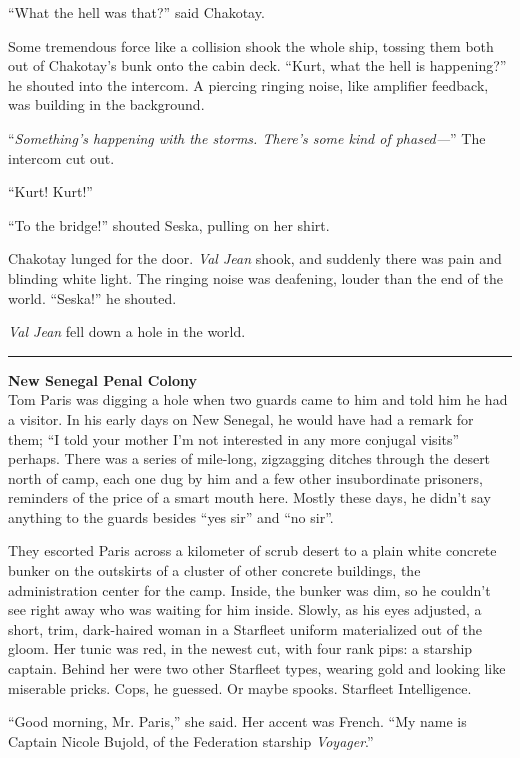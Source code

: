 \documentclass[twoside,letterpaper,12pt]{memoir}
\begin{document}
``What the hell was that?'' said Chakotay.

Some tremendous force like a collision shook the whole ship, tossing them both out of Chakotay's bunk onto the cabin deck. ``Kurt, what the hell is happening?'' he shouted into the intercom. A piercing ringing noise, like amplifier feedback, was building in the background.

``\textit{Something's happening with the storms. There's some kind of phased---}'' The intercom cut out.

``Kurt! Kurt!''

``To the bridge!'' shouted Seska, pulling on her shirt.

Chakotay lunged for the door. \textit{Val Jean} shook, and suddenly there was pain and blinding white light. The ringing noise was deafening, louder than the end of the world. ``Seska!'' he shouted.

\textit{Val Jean} fell down a hole in the world.

\fancybreak{\rule{3cm}{0.4 pt}}

\noindent\textbf{New Senegal Penal Colony}\\

Tom Paris was digging a hole when two guards came to him and told him he had a visitor. In his early days on New Senegal, he would have had a remark for them; ``I told your mother I'm not interested in any more conjugal visits'' perhaps. There was a series of mile-long, zigzagging ditches through the desert north of camp, each one dug by him and a few other insubordinate prisoners, reminders of the price of a smart mouth here. Mostly these days, he didn't say anything to the guards besides ``yes sir'' and ``no sir''.

They escorted Paris across a kilometer of scrub desert to a plain white concrete bunker on the outskirts of a cluster of other concrete buildings, the administration center for the camp. Inside, the bunker was dim, so he couldn't see right away who was waiting for him inside. Slowly, as his eyes adjusted, a short, trim, dark-haired woman in a Starfleet uniform materialized out of the gloom. Her tunic was red, in the newest cut, with four rank pips: a starship captain. Behind her were two other Starfleet types, wearing gold and looking like miserable pricks. Cops, he guessed. Or maybe spooks. Starfleet Intelligence.

``Good morning, Mr. Paris,'' she said. Her accent was French. ``My name is Captain Nicole Bujold, of the Federation starship \textit{Voyager}.''
\end{document}
